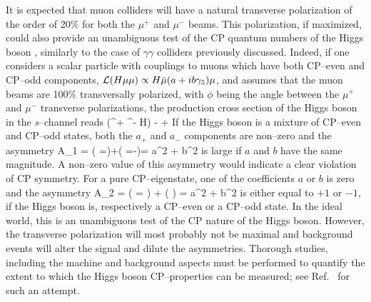 It is expected that muon colliders will have a natural transverse polarization
of the order of 20\% for both the $\mu^+$ and $\mu^-$ beams. This polarization,
if maximized, could also provide an unambiguous test of the CP quantum numbers
of the Higgs boson \cite{CP-GunionGrz,CP-Gunion-GP,mu-pol}, similarly to the
case of $\gamma \gamma$  colliders previously discussed. Indeed, if one
considers a scalar particle with couplings to muons which have both CP--even
and CP--odd components, ${\cal L}(H \mu\mu) \propto H \bar{\mu} (a + i
b\gamma_5)\mu$, and assumes that the muon beams are 100\% transversally
polarized, with $\phi$ being the angle between the $\mu^+$ and $\mu^-$
transverse polarizations, the production cross section of the Higgs boson in
the $s$--channel reads 
\beq
\sigma(\mu^+ \mu^- \to H)  -  
\cos \phi +  \sin \phi
\eeq
If the Higgs boson is a mixture of CP--even and CP--odd states, both the
$a_+$ and $a_-$ components are non--zero and the asymmetry 
\beq
{\cal A}_1 = 
{\sigma( \phi=)+\sigma( \phi=-)}=
{a^2 + b^2} 
\eeq
is large if $a$ and $b$ have the same magnitude. A non--zero value of this
asymmetry would indicate a clear violation of CP symmetry. For a pure 
CP--eigenstate, one of the coefficients $a$ or $b$ is zero and the 
asymmetry
\beq
{\cal A}_2 = 
{ \sigma( \phi= \pi) + \sigma( )} = 
{a^2 + b^2} 
\eeq
is either equal to $+1$ or $-1$, if the Higgs boson is, respectively a CP--even
or a CP--odd state. In the ideal world, this is an unambiguous  test of the CP
nature of the Higgs boson. However, the transverse polarization will most 
probably not be maximal
and background events will alter the signal and dilute the asymmetries. 
Thorough studies, including the machine and background aspects must be
performed to quantify the extent to which the Higgs boson CP--properties can be
measured; see  Ref.~\cite{CP-Gunion-GP} for such an attempt. 

